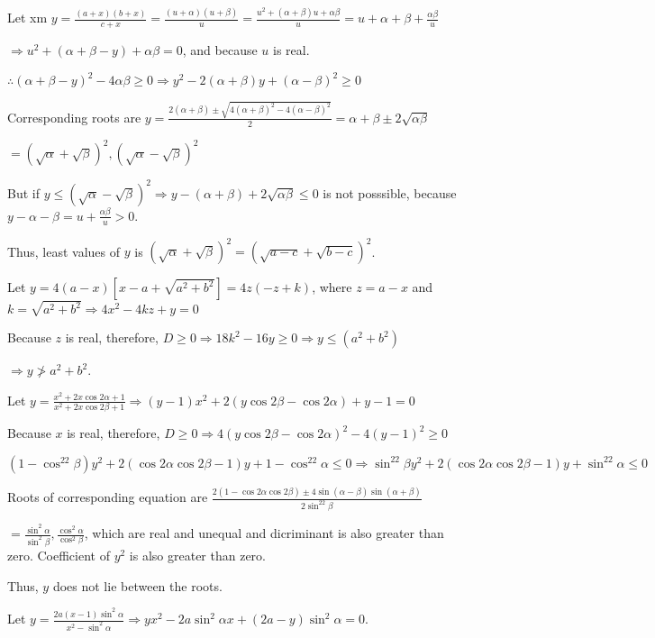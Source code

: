   Let xm
  $y = \frac{(a + x)(b + x)}{c + x} = \frac{(u + \alpha)(u + \beta)}{u} = \frac{u^2 + (\alpha + \beta)u +
    \alpha\beta}{u} = u + \alpha + \beta + \frac{\alpha\beta}{u}$

  $\Rightarrow u^2 + (\alpha + \beta - y) + \alpha\beta = 0$, and because $u$ is real.

  $\therefore (\alpha + \beta - y)^2 - 4\alpha\beta \geq 0 \Rightarrow y^2 - 2(\alpha + \beta)y + (\alpha -
  \beta)^2\geq 0$

  Corresponding roots are $y = \frac{2(\alpha + \beta)\pm\sqrt{4(\alpha + \beta)^2 - 4(\alpha -
      \beta)^2}}{2} = \alpha + \beta \pm2\sqrt{\alpha\beta}$

  $= (\sqrt{\alpha} + \sqrt{\beta})^2, (\sqrt{\alpha} - \sqrt{\beta})^2$

  But if $y \leq (\sqrt{\alpha} - \sqrt{\beta})^2 \Rightarrow y - (\alpha + \beta) + 2\sqrt{\alpha\beta}
  \leq 0$ is not posssible, because $y - \alpha - \beta = u + \frac{\alpha\beta}{u} > 0$.

  Thus, least values of $y$ is $(\sqrt{\alpha} + \sqrt{\beta})^2 = (\sqrt{a - c} + \sqrt{b - c})^2$.
\item Let $y = 4(a - x)[x - a + \sqrt{a^2 + b^2}] = 4z(-z + k)$, where $z = a - x$ and $k = \sqrt{a^2 +
  b^2}\Rightarrow 4x^2 - 4kz + y = 0$

  Because $z$ is real, therefore, $D\geq 0 \Rightarrow 18k^2 - 16y\geq 0 \Rightarrow y\leq (a^2 + b^2)$

  $\Rightarrow y\ngtr a^2 + b^2$.
\item Let $y = \frac{x^2 + 2x\cos2\alpha + 1}{x^2 + 2x\cos2\beta + 1}\Rightarrow (y - 1)x^2 + 2(y\cos2\beta
  - \cos2\alpha) + y - 1 = 0$

  Because $x$ is real, therefore, $D\geq 0 \Rightarrow 4(y\cos2\beta - \cos2\alpha)^2 - 4(y - 1)^2\geq 0$

  $(1 - \cos^22\beta)y^2 + 2(\cos2\alpha\cos2\beta - 1)y + 1 - \cos^22\alpha \leq 0\Rightarrow \sin^22\beta
  y^2 + 2(\cos2\alpha\cos2\beta - 1)y + \sin^22\alpha \leq 0$

  Roots of corresponding equation are $\frac{2(1 - \cos2\alpha\cos2\beta)\pm4\sin(\alpha - \beta)\sin(\alpha
    + \beta)}{2\sin^22\beta}$

  $= \frac{\sin^2\alpha}{\sin^2\beta}, \frac{\cos^2\alpha}{\cos^2\beta}$, which are real and unequal and
  dicriminant is also greater than zero. Coefficient of $y^2$ is also greater than zero.

  Thus, $y$ does not lie between the roots.
\item Let $y = \frac{2a(x - 1)\sin^2\alpha}{x^2 -\sin^2\alpha} \Rightarrow yx^2 - 2a\sin^2\alpha x + (2a -
  y)\sin^2\alpha = 0$.

